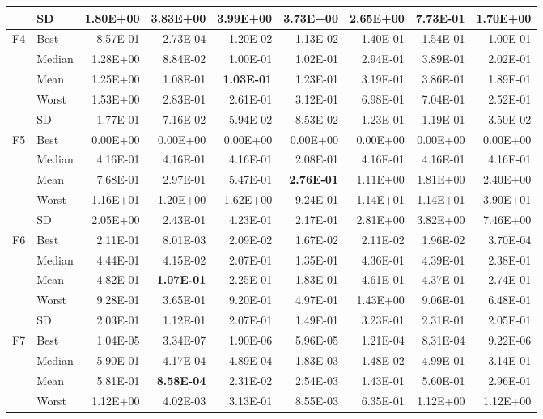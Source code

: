 \documentclass[10pt,a4paper]{article}
\newcommand{\bestval}[1]{\textbf{#1}}
\begin{document}
\begin{table}[p]
\begin{tabular}{llrrrrrrr}
 & SD & 1.80E+00 & 3.83E+00 & 3.99E+00 & 3.73E+00 & 2.65E+00 & 7.73E-01 & 1.70E+00 \\
\midrule
F4 & Best & 8.57E-01 & 2.73E-04 & 1.20E-02 & 1.13E-02 & 1.40E-01 & 1.54E-01 & 1.00E-01 \\
 & Median & 1.28E+00 & 8.84E-02 & 1.00E-01 & 1.02E-01 & 2.94E-01 & 3.89E-01 & 2.02E-01 \\
 & Mean & 1.25E+00 & 1.08E-01 & \bestval{1.03E-01} & 1.23E-01 & 3.19E-01 & 3.86E-01 & 1.89E-01 \\
 & Worst & 1.53E+00 & 2.83E-01 & 2.61E-01 & 3.12E-01 & 6.98E-01 & 7.04E-01 & 2.52E-01 \\
 & SD & 1.77E-01 & 7.16E-02 & 5.94E-02 & 8.53E-02 & 1.23E-01 & 1.19E-01 & 3.50E-02 \\
\midrule
F5 & Best & 0.00E+00 & 0.00E+00 & 0.00E+00 & 0.00E+00 & 0.00E+00 & 0.00E+00 & 0.00E+00 \\
 & Median & 4.16E-01 & 4.16E-01 & 4.16E-01 & 2.08E-01 & 4.16E-01 & 4.16E-01 & 4.16E-01 \\
 & Mean & 7.68E-01 & 2.97E-01 & 5.47E-01 & \bestval{2.76E-01} & 1.11E+00 & 1.81E+00 & 2.40E+00 \\
 & Worst & 1.16E+01 & 1.20E+00 & 1.62E+00 & 9.24E-01 & 1.14E+01 & 1.14E+01 & 3.90E+01 \\
 & SD & 2.05E+00 & 2.43E-01 & 4.23E-01 & 2.17E-01 & 2.81E+00 & 3.82E+00 & 7.46E+00 \\
\midrule
F6 & Best & 2.11E-01 & 8.01E-03 & 2.09E-02 & 1.67E-02 & 2.11E-02 & 1.96E-02 & 3.70E-04 \\
 & Median & 4.44E-01 & 4.15E-02 & 2.07E-01 & 1.35E-01 & 4.36E-01 & 4.39E-01 & 2.38E-01 \\
 & Mean & 4.82E-01 & \bestval{1.07E-01} & 2.25E-01 & 1.83E-01 & 4.61E-01 & 4.37E-01 & 2.74E-01 \\
 & Worst & 9.28E-01 & 3.65E-01 & 9.20E-01 & 4.97E-01 & 1.43E+00 & 9.06E-01 & 6.48E-01 \\
 & SD & 2.03E-01 & 1.12E-01 & 2.07E-01 & 1.49E-01 & 3.23E-01 & 2.31E-01 & 2.05E-01 \\
\midrule
F7 & Best & 1.04E-05 & 3.34E-07 & 1.90E-06 & 5.96E-05 & 1.21E-04 & 8.31E-04 & 9.22E-06 \\
 & Median & 5.90E-01 & 4.17E-04 & 4.89E-04 & 1.83E-03 & 1.48E-02 & 4.99E-01 & 3.14E-01 \\
 & Mean & 5.81E-01 & \bestval{8.58E-04} & 2.31E-02 & 2.54E-03 & 1.43E-01 & 5.60E-01 & 2.96E-01 \\
 & Worst & 1.12E+00 & 4.02E-03 & 3.13E-01 & 8.55E-03 & 6.35E-01 & 1.12E+00 & 1.12E+00 \\

\end{tabular}
\end{table}
\end{document}
